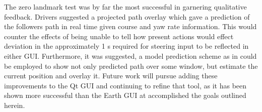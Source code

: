 \documentclass[twocolumn,10pt]{article}
\begin{document}
  The zero landmark test was by far the most successful in garnering qualitative feedback.  Drivers suggested a projected path overlay which gave a prediction of the followers path in real time given course and yaw rate information.  This would counter the effects of being unable to tell how present actions would effect deviation in the approximately 1 s required for steering input to be reflected in either GUI.  Furthermore, it was suggested, a model prediction scheme as in \cite{williamthesis} could be employed to show not only predicted path over some window, but estimate the current position and overlay it.  Future work will pursue adding these improvements to the Qt GUI and continuing to refine that tool, as it has been shown more successful than the Earth GUI at accomplished the goals outlined herein.




\nocite{CofieldUGThesis}

\end{document}
